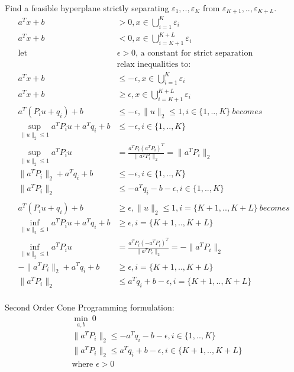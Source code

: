 \documentclass[12pt,letter]{article}
\newcommand{\norm}[1]{\|#1\|}
\begin{document}
\begin{enumerate}
  Find a feasible hyperplane strictly separating $\varepsilon_1,..,\varepsilon_K$ from $\varepsilon_{K+1},..,\varepsilon_{K+L}$.
  \begin{align*}
    a^Tx+b &> 0, x \in \bigcup_{i=1}^K \varepsilon_i\\
    a^Tx+b &< 0, x \in \bigcup_{i=K+1}^{K+L} \varepsilon_i\\
    \text{let } &\epsilon > 0 \text{, a constant for strict separation}\\
    &\text{relax inequalities to:}\\
    a^Tx+b &\leq -\epsilon, x \in \bigcup_{i=1}^K \varepsilon_i\\
    a^Tx+b &\geq \epsilon, x \in \bigcup_{i=K+1}^{K+L} \varepsilon_i\\
    a^T(P_iu+q_i)+b &\leq -\epsilon, \norm{u}_2 \leq 1, i\in\{1,..,K\}\ becomes\\
    \sup_{\norm{u}_2 \leq 1} a^TP_iu + a^Tq_i + b &\leq -\epsilon, i\in\{1,..,K\}\\
    \sup_{\norm{u}_2 \leq 1} a^TP_iu &= \frac{a^TP_i (a^TP_i)^T}{\norm{a^TP_i}_2} = \norm{a^TP_i}_2\\
    \norm{a^TP_i}_2 + a^Tq_i + b &\leq -\epsilon, i\in\{1,..,K\}\\
    \norm{a^TP_i}_2 &\leq -a^Tq_i - b  -\epsilon, i\in\{1,..,K\}\\
    \\
    a^T(P_iu+q_i)+b &\geq \epsilon, \norm{u}_2 \leq 1, i=\{K+1,..,K+L\} \ becomes\\
    \inf_{\norm{u}_2 \leq 1} a^TP_iu + a^Tq_i + b &\geq \epsilon, i=\{K+1,..,K+L\}\\
    \inf_{\norm{u}_2 \leq 1} a^TP_iu &= \frac{a^TP_i (-a^TP_i)^T}{\norm{a^TP_i}_2} = -\norm{a^TP_i}_2\\
    -\norm{a^TP_i}_2 + a^Tq_i + b &\geq \epsilon, i=\{K+1,..,K+L\}\\
    \norm{a^TP_i}_2 &\leq a^Tq_i + b -\epsilon, i=\{K+1,..,K+L\}\\
  \end{align*}
  
  Second Order Cone Programming formulation:
  \begin{align*}
    &\min_{a,b}\ 0\\
    &\norm{a^TP_i}_2 \leq -a^Tq_i - b  -\epsilon, i\in\{1,..,K\}\\
    &\norm{a^TP_i}_2 \leq a^Tq_i + b -\epsilon, i\in\{K+1,..,K+L\}\\
    &\text{where } \epsilon > 0
  \end{align*}


\end{enumerate}
\end{document}
